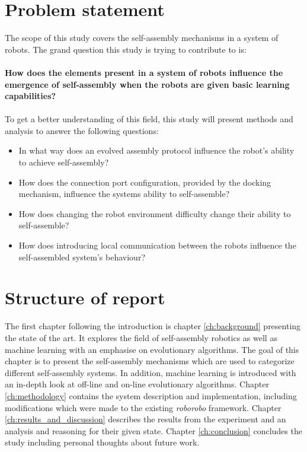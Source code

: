 \section{Problem statement}
The scope of this study covers the self-assembly mechanisms in a system of robots. 
The grand question this study is trying to contribute to is:\\ \\
\textbf{How does the elements present in a system of robots influence the emergence of self-assembly when the robots are given basic learning capabilities?\\ \\}
To get a better understanding of this field, this study will present methods and analysis to answer the following questions:

\begin{itemize}

\item In what way does an evolved assembly protocol influence the robot’s ability to achieve self-assembly?

\item How does the connection port configuration, provided by the docking mechanism, influence the systems ability to self-assemble?

\item How does changing the robot environment difficulty change their ability to self-assemble?

\item How does introducing local communication between the robots influence the self-assembled system's behaviour?

\end{itemize}

\section{Structure of report}
The first chapter following the introduction is chapter \ref{ch:background} presenting the state of the art. It explores the field of self-assembly robotics as well as machine learning with an emphasise on evolutionary algorithms. The goal of this chapter is to present the self-assembly mechanisms which are used to categorize different self-assembly systems. In addition, machine learning is introduced with an in-depth look at off-line and on-line evolutionary algorithms. Chapter \ref{ch:methodology} contains the system description and implementation, including modifications which were made to the existing \emph{roborobo} framework. Chapter \ref{ch:results_and_discussion} describes the results from the experiment and an analysis and reasoning for their given state.
Chapter \ref{ch:conclusion} concludes the study including personal thoughts about future work.
